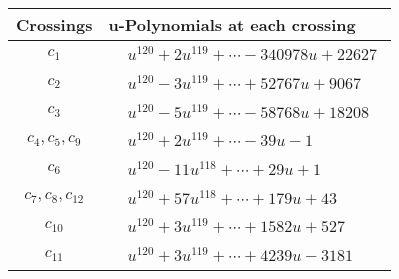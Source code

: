 \documentclass[1p]{elsarticle_modified}
\theoremstyle{definition}
\begin{document}
\begin{tabular}{m{50pt}|m{274pt}}
Crossings & \hspace{64pt}u-Polynomials at each crossing \\
\hline $$\begin{aligned}c_{1}\end{aligned}$$&$\begin{aligned}
&u^{120}+2 u^{119}+\cdots-340978 u+22627
\end{aligned}$\\
\hline $$\begin{aligned}c_{2}\end{aligned}$$&$\begin{aligned}
&u^{120}-3 u^{119}+\cdots+52767 u+9067
\end{aligned}$\\
\hline $$\begin{aligned}c_{3}\end{aligned}$$&$\begin{aligned}
&u^{120}-5 u^{119}+\cdots-58768 u+18208
\end{aligned}$\\
\hline $$\begin{aligned}c_{4},c_{5},c_{9}\end{aligned}$$&$\begin{aligned}
&u^{120}+2 u^{119}+\cdots-39 u-1
\end{aligned}$\\
\hline $$\begin{aligned}c_{6}\end{aligned}$$&$\begin{aligned}
&u^{120}-11 u^{118}+\cdots+29 u+1
\end{aligned}$\\
\hline $$\begin{aligned}c_{7},c_{8},c_{12}\end{aligned}$$&$\begin{aligned}
&u^{120}+57 u^{118}+\cdots+179 u+43
\end{aligned}$\\
\hline $$\begin{aligned}c_{10}\end{aligned}$$&$\begin{aligned}
&u^{120}+3 u^{119}+\cdots+1582 u+527
\end{aligned}$\\
\hline $$\begin{aligned}c_{11}\end{aligned}$$&$\begin{aligned}
&u^{120}+3 u^{119}+\cdots+4239 u-3181
\end{aligned}$\\
\hline
\end{tabular}\\~\\
\end{document}
